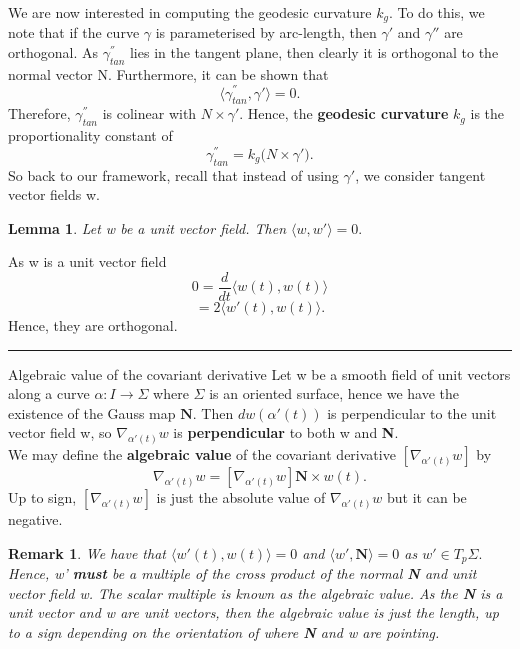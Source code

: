 \documentclass[twoside]{article}
\newtheorem{lemma}[theorem]{Lemma}
\newtheorem{remark}[theorem]{Remark}
\newenvironment{proof}{{\bf Proof:}}{\hfill\rule{2mm}{2mm}}
\begin{document}
We are now interested in computing the geodesic curvature $k_g.$ To do this, we note that if the curve $\gamma$ is parameterised by arc-length, then $\gamma'$ and $\gamma''$ are orthogonal. As $\gamma_{tan}^{''}$ lies in the tangent plane, then clearly it is orthogonal to the normal vector N. Furthermore, it can be shown that 
$$
\langle \gamma_{tan}^{''}, \gamma'\rangle = 0.
$$
Therefore, $\gamma_{tan}^{''}$ is colinear with $N \times \gamma'$. Hence, the \textbf{geodesic curvature} $k_g$ is the proportionality constant of 
$$
\gamma_{tan}^{''} = k_g\bigg(N \times \gamma' \bigg).
$$
So back to our framework, recall that instead of using $\gamma'$, we consider tangent vector fields w.
\newline 
\begin{lemma}Let w be a unit vector field. Then $\langle w, w'\rangle = 0.$
\end{lemma}
\begin{proof}As w is a unit vector field 
$$
0 = \frac{d}{dt}\langle w(t),w(t)\rangle 
$$
$$
= 2\langle w'(t),w(t)\rangle.
$$
Hence, they are orthogonal.
\end{proof}
\begin{definition_exam}{Algebraic value of the covariant derivative}{} Let w be a smooth field of unit vectors along a curve $\alpha: I \rightarrow \Sigma$ where $\Sigma$ is an oriented surface, hence we have the existence of the Gauss map $\textbf{N}$. Then $dw(\alpha'(t))$ is perpendicular to the unit vector field w, so $\nabla_{\alpha'(t)}w$ is \textbf{perpendicular} to both w and \textbf{N}. \\We may define the \textbf{algebraic value} of the covariant derivative $[\nabla_{\alpha'(t)}w]$ by 
$$
\nabla_{\alpha'(t)}w = [\nabla_{\alpha'(t)}w]\mathbf{N} \times w(t).
$$
Up to sign, $[\nabla_{\alpha'(t)}w]$ is just the absolute value of $\nabla_{\alpha'(t)}w$ but it can be negative. 
\end{definition_exam}

\begin{remark}We have that $\langle w'(t), w(t) \rangle = 0$ and $\langle w', \textbf{N}\rangle = 0$ as $w' \in T_p\Sigma.$ Hence, w' \textbf{must} be a multiple of the cross product of the normal \textbf{N} and unit vector field w. The scalar multiple is known as the algebraic value. As the \textbf{N} is a unit vector and w are unit vectors, then the algebraic value is just the length, up to a sign depending on the orientation of where \textbf{N} and w are pointing.
\end{remark}
\end{document}
